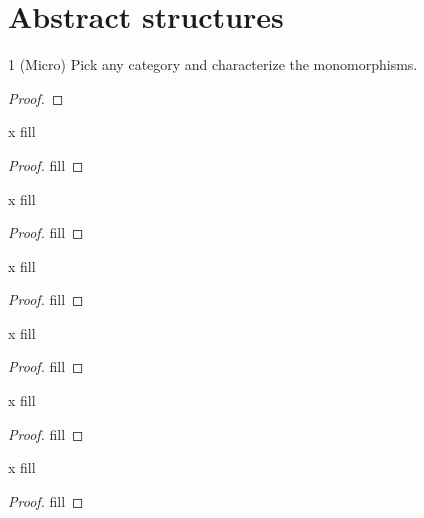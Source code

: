 \section{Abstract structures}

\begin{exercise}{1 (Micro)}
Pick any category and characterize the monomorphisms.
\end{exercise}
\begin{proof}

\end{proof} 

\begin{exercise}{x}
fill
\end{exercise}
\begin{proof}
fill
\end{proof} 

\begin{exercise}{x}
fill
\end{exercise}
\begin{proof}
fill
\end{proof} 

\begin{exercise}{x}
fill
\end{exercise}
\begin{proof}
fill
\end{proof} 

\begin{exercise}{x}
fill
\end{exercise}
\begin{proof}
fill
\end{proof} 

\begin{exercise}{x}
fill
\end{exercise}
\begin{proof}
fill
\end{proof} 

\begin{exercise}{x}
fill
\end{exercise}
\begin{proof}
fill
\end{proof} 

